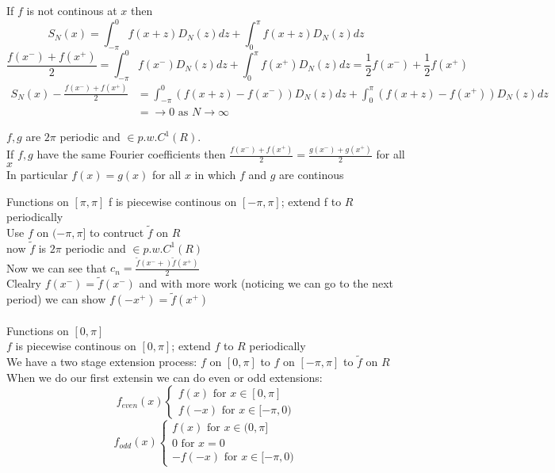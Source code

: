 \documentclass[answers,12pt,addpoints]{exam}
\begin{document}
If $f$ is not continous at $x$ then 
$$ S_N(x) = \int_{-\pi}^{0} f(x+z) D_N(z) dz + \int_{0}^{\pi} f(x+z) D_N(z) dz$$
$$ \frac{f(x^-) + f(x^+)}{2} =  \int_{-\pi}^{0} f(x^-) D_N(z) dz + \int_{0}^{\pi} f(x^+) D_N(z) dz = \frac{1}{2} f(x^-) + \frac{1}{2} f(x^+)$$
\begin{align*}
    S_N(x) - \frac{f(x^-) + f(x^+)}{2} &= \int_{-\pi}^{0} (f(x+z) - f(x^-)) D_N(z) dz + \int_{0}^{\pi} (f(x+z) - f(x^+)) D_N(z) dz\\
    &= \to 0 \text{ as } N \to \infty
\end{align*}
\begin{corollary}
    $f,g$ are $2\pi$ periodic and $\in p.w.C^1(R)$.\\
    If $f, g$ have the same Fourier coefficients then $\frac{f(x^-) + f(x^+)}{2} = \frac{g(x^-) + g(x^+)}{2}$ for all $x$\\
    In particular $f(x) = g(x)$ for all $x$ in which $f$ and $g$ are continous
\end{corollary}
Functions on $[\pi, \pi]$ f is piecewise continous on $[-\pi, \pi]$; extend f to $R$ periodically\\
Use $f$ on $(-\pi, \pi]$ to contruct $\tilde{f}$ on $R$\\
now $\tilde{f}$ is $2\pi$ periodic and $\in p.w.C^1(R)$\\
Now we can see that $c_n = \frac{\tilde{f}(x^{-} + ) \tilde{f}(x^+)}{2}$\\
Clealry $f(x^-) = \tilde{f}(x^-)$ and with more work (noticing we can go to the next period) we can show $f(-x^+) = \tilde{f}(x^+)$\\\\
Functions on $[0, \pi]$\\
$f$ is piecewise continous on $[0, \pi]$; extend $f$ to $R$ periodically\\
We have a two stage extension process: $f$ on $[0, \pi]$ to $f$ on $[-\pi, \pi]$ to $\tilde{f}$ on $R$\\
When we do our first extensin we can do even or odd extensions:
$$f_{even}(x) \begin{cases}
    f(x) \text{ for } x \in [0, \pi]\\
    f(-x) \text{ for } x \in [-\pi, 0)
\end{cases}$$
$$f_{odd}(x) \begin{cases}
    f(x) \text{ for } x \in (0, \pi]\\
    0 \text{ for } x = 0\\
    -f(-x) \text{ for } x \in [-\pi, 0)
\end{cases}$$
\end{document}
